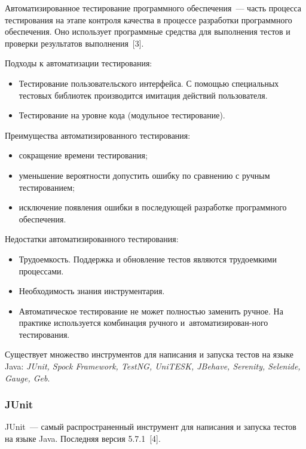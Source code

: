  Автоматизированное тестирование программного обеспечения~--- часть процесса тестирования на этапе контроля качества в процессе разработки программного обеспечения. Оно использует программные средства для выполнения тестов и проверки результатов выполнения~[3].
 
 Подходы к автоматизации тестирования:
 
 \begin{itemize}
 	\item Тестирование пользовательского интерфейса. С помощью специальных тестовых библиотек производится имитация действий пользователя.
 	\item Тестирование на уровне кода (модульное тестирование).
 \end{itemize} 

 Преимущества автоматизированного тестирования:

\begin{itemize}
	\item сокращение времени тестирования; 
	\item уменьшение вероятности допустить ошибку по сравнению с ручным тестированием;
	\item исключение появления ошибки в последующей разработке программного обеспечения.
\end{itemize} 

 Недостатки автоматизированного тестирования:

\begin{itemize}
	\item Трудоемкость. Поддержка и обновление тестов являются трудоемкими процессами.
	\item Необходимость знания инструментария.
	\item Автоматическое тестирование не может полностью заменить ручное. На практике используется комбинация ручного и~автоматизирован-ного тестирования.
\end{itemize} 

Существует множество инструментов для написания и запуска тестов на языке Java: \textit{JUnit, Spock Framework, TestNG, UniTESK, JBehave, Serenity, Selenide, Gauge, Geb}.


\subsubsection{JUnit}

JUnit~--- самый распространенный инструмент для написания и запуска тестов на языке Java. Последняя версия 5.7.1~[4].

